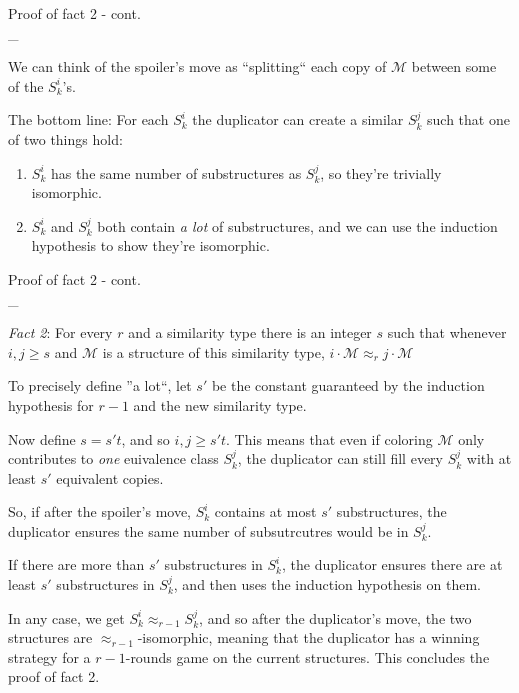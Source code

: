 \documentclass[landscape,a4]{myslides}
\begin{document}
\begin{slide}
\begin{center}
{%
\color{blue}
Proof of fact 2 - cont.
}
\\
\_\hrulefill
\end{center}
\small

We can think of the spoiler's move as ``splitting`` each copy of $\mathcal{M}$ between some of the $S_k^i$'s.

The bottom line: For each $S_k^i$ the duplicator can create a similar $S_k^j$ such that one of two things hold:
\begin{enumerate}
 \item $S_k^i$ has the same number of substructures as $S_k^j$, so they're trivially isomorphic.
 \item $S_k^i$ and $S_k^j$ both contain \emph{a lot} of substructures, and we can use the induction hypothesis to show they're isomorphic.
\end{enumerate}

\end{slide}


\begin{slide}
\begin{center}
{%
\color{blue}
Proof of fact 2 - cont.
}
\\
\_\hrulefill
\end{center}
\small

\emph{Fact 2}: For every $r$ and a similarity type there is an integer $s$ such that whenever $i,j\ge s$ and $\mathcal{M}$ is a structure of this similarity type, $i\cdot\mathcal{M}\approx_rj\cdot\mathcal{M}$

To precisely define ''a lot``, let $s'$ be the constant guaranteed by the induction hypothesis for $r-1$ and the new similarity type.

Now define $s=s't$, and so $i,j\ge s't$. This means that even if coloring $\mathcal{M}$ only contributes to \emph{one} euivalence class $S_k^j$, the duplicator
can still fill every $S_k^j$ with at least $s'$ equivalent copies.

So, if after the spoiler's move, $S_k^i$ contains at most $s'$ substructures, the duplicator ensures the same number of subsutrcutres would be in $S_k^j$.

If there are more than $s'$ substructures in $S_k^i$, the duplicator ensures there are at least $s'$ substructures in $S_k^j$, and then uses the induction hypothesis on them.

In any case, we get $S_k^i\approx_{r-1} S_k^j$, and so after the duplicator's move, the two structures are $\approx_{r-1}$-isomorphic, meaning that the duplicator has a winning strategy for a $r-1$-rounds game on the current structures. This concludes the proof of fact 2.
\end{slide}
\end{document}
